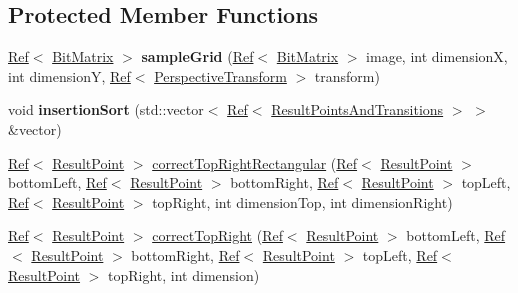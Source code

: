 \subsection*{Protected Member Functions}
\begin{DoxyCompactItemize}
\item 
\mbox{\label{classzxing_1_1datamatrix_1_1_detector_a593d544a7a20f31798fd7fe6e5a1ce8e}} 
\mbox{\hyperlink{classzxing_1_1_ref}{Ref}}$<$ \mbox{\hyperlink{classzxing_1_1_bit_matrix}{Bit\+Matrix}} $>$ {\bfseries sample\+Grid} (\mbox{\hyperlink{classzxing_1_1_ref}{Ref}}$<$ \mbox{\hyperlink{classzxing_1_1_bit_matrix}{Bit\+Matrix}} $>$ image, int dimensionX, int dimensionY, \mbox{\hyperlink{classzxing_1_1_ref}{Ref}}$<$ \mbox{\hyperlink{classzxing_1_1_perspective_transform}{Perspective\+Transform}} $>$ transform)
\item 
\mbox{\label{classzxing_1_1datamatrix_1_1_detector_a390090d299fbee0958b2bd0bca2f9b6f}} 
void {\bfseries insertion\+Sort} (std\+::vector$<$ \mbox{\hyperlink{classzxing_1_1_ref}{Ref}}$<$ \mbox{\hyperlink{classzxing_1_1datamatrix_1_1_result_points_and_transitions}{Result\+Points\+And\+Transitions}} $>$ $>$ \&vector)
\item 
\mbox{\hyperlink{classzxing_1_1_ref}{Ref}}$<$ \mbox{\hyperlink{classzxing_1_1_result_point}{Result\+Point}} $>$ \mbox{\hyperlink{classzxing_1_1datamatrix_1_1_detector_afbf5fea4c097a6bce2c3a5606daf6d0f}{correct\+Top\+Right\+Rectangular}} (\mbox{\hyperlink{classzxing_1_1_ref}{Ref}}$<$ \mbox{\hyperlink{classzxing_1_1_result_point}{Result\+Point}} $>$ bottom\+Left, \mbox{\hyperlink{classzxing_1_1_ref}{Ref}}$<$ \mbox{\hyperlink{classzxing_1_1_result_point}{Result\+Point}} $>$ bottom\+Right, \mbox{\hyperlink{classzxing_1_1_ref}{Ref}}$<$ \mbox{\hyperlink{classzxing_1_1_result_point}{Result\+Point}} $>$ top\+Left, \mbox{\hyperlink{classzxing_1_1_ref}{Ref}}$<$ \mbox{\hyperlink{classzxing_1_1_result_point}{Result\+Point}} $>$ top\+Right, int dimension\+Top, int dimension\+Right)
\item 
\mbox{\hyperlink{classzxing_1_1_ref}{Ref}}$<$ \mbox{\hyperlink{classzxing_1_1_result_point}{Result\+Point}} $>$ \mbox{\hyperlink{classzxing_1_1datamatrix_1_1_detector_a978bb9582b4d69f75c88b94c57985405}{correct\+Top\+Right}} (\mbox{\hyperlink{classzxing_1_1_ref}{Ref}}$<$ \mbox{\hyperlink{classzxing_1_1_result_point}{Result\+Point}} $>$ bottom\+Left, \mbox{\hyperlink{classzxing_1_1_ref}{Ref}}$<$ \mbox{\hyperlink{classzxing_1_1_result_point}{Result\+Point}} $>$ bottom\+Right, \mbox{\hyperlink{classzxing_1_1_ref}{Ref}}$<$ \mbox{\hyperlink{classzxing_1_1_result_point}{Result\+Point}} $>$ top\+Left, \mbox{\hyperlink{classzxing_1_1_ref}{Ref}}$<$ \mbox{\hyperlink{classzxing_1_1_result_point}{Result\+Point}} $>$ top\+Right, int dimension)

\end{DoxyCompactItemize}
